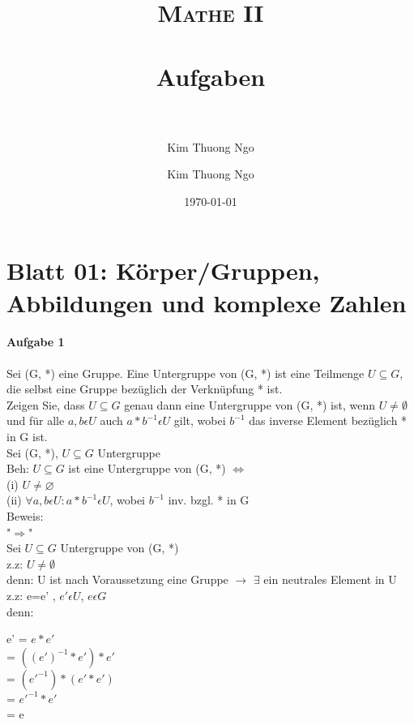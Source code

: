 \documentclass[paper=a4, fontsize=11pt]{scrartcl}
\author{Kim Thuong Ngo}
\title{	
\normalfont \normalsize 
\textsc{Mathe II} \\ [25pt] 
\horrule{0.5pt} \\[0.4cm] 
\huge Aufgaben \\ 
\horrule{2pt} \\[0.5cm] 
}
\author{Kim Thuong Ngo}
\date{\normalsize\today}
\numberwithin{equation}{section}
\numberwithin{figure}{section}
\numberwithin{table}{section}
\begin{document}
\maketitle 

\newpage

\tableofcontents

\newpage


\section{Blatt 01: Körper/Gruppen, Abbildungen und komplexe Zahlen}

\paragraph{Aufgabe 1}

Sei (G, *) eine Gruppe. Eine Untergruppe von (G, *) ist eine Teilmenge $U \subseteq G$, die selbst eine Gruppe bezüglich der Verknüpfung * ist. \\

Zeigen Sie, dass $U \subseteq G$ genau dann eine Untergruppe von (G, *) ist, wenn $U \neq \emptyset$ und für alle $a, b \epsilon U$ auch $a * b^{-1} \epsilon U$ gilt, wobei $b^{-1}$ das inverse Element bezüglich * in G ist. \\

Sei (G, *), $U \subseteq G$ Untergruppe \\

Beh: $U \subseteq G$ ist eine Untergruppe von (G, *) $\Longleftrightarrow$ \\
(i) $U \neq\varnothing$ \\
(ii) $\forall a,b \epsilon U : a*b^{-1} \epsilon U$, wobei $b^{-1}$ inv. bzgl. * in G \\

Beweis:\\
"$\Rightarrow$" \\
Sei $U \subseteq G$ Untergruppe von (G, *) \\
z.z: $U \neq \emptyset$ \\
denn: U ist nach Voraussetzung eine Gruppe $\longrightarrow$ $\exists$ ein neutrales Element in U \\

z.z: e=e' , $e' \epsilon U$, $e \epsilon G$ \\
denn: 
\begin{flushleft}
e' = $e*e'$  \\
= $((e')^{-1}*e')*e'$ \\ 
= $(e'^{-1})*(e'*e')$ \\
= $e'^{-1}*e'$ \\  
= e \\
\end{flushleft}
\end{document}
